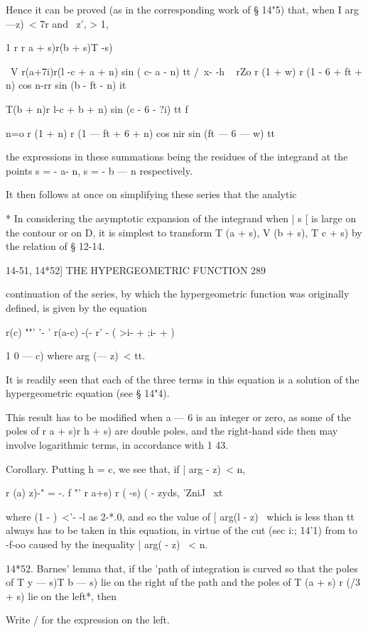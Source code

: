 Hence it can be proved (as in the corresponding work of § 14"5) that,
when I arg —z)\ < 7r and \ z', > 1,

1 r r a + s)r(b + s)T -s)

\ V r(a+7i)r(l -c + a + n) sin ( c- a - n) tt /\ x- -h ~ rZo r (1 + w)
r (1 - 6 + ft + n) cos n-rr sin (b - ft - n) it

  T(b + n)r l-c + b + n) sin (c - 6 - ?i) tt f \

n=o r (1 + n) r (1 — ft + 6 + n) cos nir sin (ft — 6 — w) tt

the expressions in these summations being the residues of the
integrand at the points s = - a- n, s = - b — n respectively.

It then follows at once on simplifying these series that the analytic

* In considering the asymptotic expansion of the integrand when | s [
is large on the contour or on D, it is simplest to transform T (a +
s), V (b + s), T c + s) by the relation of § 12-14.

14-51, 14*52] THE HYPERGEOMETRIC FUNCTION 289

continuation of the series, by which the hypergeometric function was
originally defined, is given by the equation

r(c) ""' '- ' r(a-c) -(- r' - ( >i- + ;i- + )

1 0 — c) where arg (— z)\ < tt.

It is readily seen that each of the three terms in this equation is a
solution of the hypergeometric equation (see § 14"4).

This result has to be modified when a — 6 is an integer or zero, as
some of the poles of r a + s)r h + s) are double poles, and the
right-hand side then may involve logarithmic terms, in accordance with
1 43.

Corollary. Putting h = c, we see that, if | arg - z)\ < n,

r (a) z)-" = -. f "' r a+s) r ( -s) ( - zyds, 'ZniJ \ xt

where (1 - )~<'- -l as 2-*.0, and so the value of [ arg(l - z) \ which
is less than tt always has to be taken in this equation, in virtue of
the cut (sec i:; 14'1) from to -f-oo caused by the inequality | arg( -
z) \ < n.

14*52. Barnes' lemma that, if the 'path of integration is curved so
that the poles of T y — s)T b — s) lie on the right uf the path and
the poles of T (a + s) r (/3 + s) lie on the left*, then

Write / for the expression on the left.

